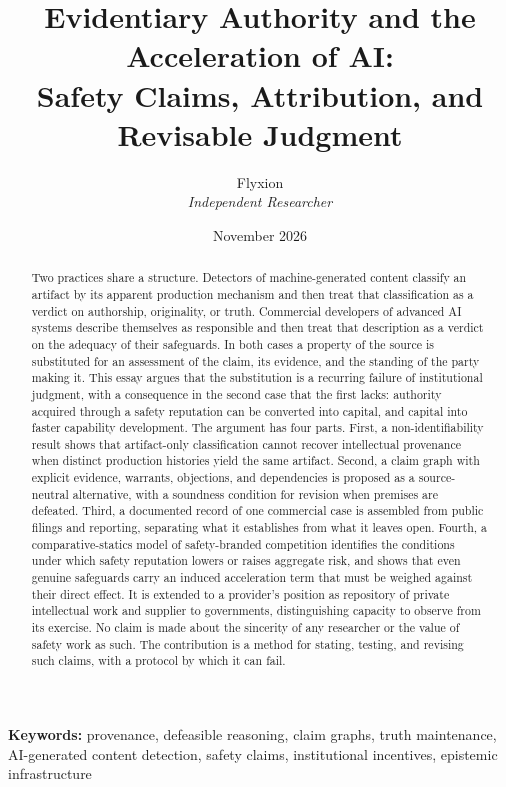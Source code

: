 \documentclass[12pt]{article}
\title{Evidentiary Authority and the Acceleration of AI:\\
Safety Claims, Attribution, and Revisable Judgment}
\author{Flyxion\\\textit{Independent Researcher}}
\date{November 2026}
\theoremstyle{definition}
\theoremstyle{remark}
\begin{document}
\maketitle
\thispagestyle{empty}

\begin{singlespace}\small
\begin{abstract}
Two practices share a structure. Detectors of machine-generated content classify an artifact by its apparent production mechanism and then treat that classification as a verdict on authorship, originality, or truth. Commercial developers of advanced AI systems describe themselves as responsible and then treat that description as a verdict on the adequacy of their safeguards. In both cases a property of the source is substituted for an assessment of the claim, its evidence, and the standing of the party making it. This essay argues that the substitution is a recurring failure of institutional judgment, with a consequence in the second case that the first lacks: authority acquired through a safety reputation can be converted into capital, and capital into faster capability development. The argument has four parts. First, a non-identifiability result shows that artifact-only classification cannot recover intellectual provenance when distinct production histories yield the same artifact. Second, a claim graph with explicit evidence, warrants, objections, and dependencies is proposed as a source-neutral alternative, with a soundness condition for revision when premises are defeated. Third, a documented record of one commercial case is assembled from public filings and reporting, separating what it establishes from what it leaves open. Fourth, a comparative-statics model of safety-branded competition identifies the conditions under which safety reputation lowers or raises aggregate risk, and shows that even genuine safeguards carry an induced acceleration term that must be weighed against their direct effect. It is extended to a provider's position as repository of private intellectual work and supplier to governments, distinguishing capacity to observe from its exercise. No claim is made about the sincerity of any researcher or the value of safety work as such. The contribution is a method for stating, testing, and revising such claims, with a protocol by which it can fail.
\end{abstract}

\vspace{0.6em}
\noindent\textbf{Keywords:} provenance, defeasible reasoning, claim graphs, truth maintenance, AI-generated content detection, safety claims, institutional incentives, epistemic infrastructure
\end{singlespace}
\end{document}
